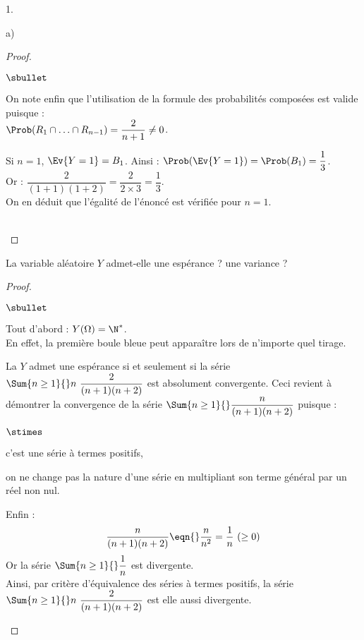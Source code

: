 \documentclass[11pt]{article}%
\begin{document}
\begin{noliste}{1.}
\begin{noliste}{a)}
\begin{proof}
\begin{noliste}{$\sbullet$}
      \item On note enfin que l'utilisation de la formule des
        probabilités composées est valide puisque : \\[.1cm]
        $\Prob(R_1 \cap
        \ldots \cap R_{n-1}) = \dfrac{2}{n+1} \neq 0$.
        
       \item Si $n = 1$, $\Ev{Y = 1} = B_1$. Ainsi : $\Prob(\Ev{Y = 1})
        = \Prob(B_1) = \dfrac{1}{3}$.\\
        Or : $\dfrac{2}{(1+1)(1+2)} = \dfrac{2}{2 \times 3} =
        \dfrac{1}{3}$.\\[.2cm]
        On en déduit que l'égalité de l'énoncé est vérifiée pour $n =
        1$.
      \end{noliste}
      ~\\[-1cm]
    \end{proof}


    \newpage


  \item La variable aléatoire $Y$ admet-elle une espérance ? une
    variance ?
    
    \begin{proof}~
      \begin{noliste}{$\sbullet$}
      \item Tout d'abord : $Y(\Omega) = \N^*$.\\
        En effet, la première boule bleue peut apparaître lors de
        n'importe quel tirage.
      \item La \var $Y$ admet une espérance si et seulement si la
        série $\Sum{n \geq 1}{} n \ \dfrac{2}{(n+1)(n+2)}$ est
        absolument convergente. Ceci revient à démontrer la
        convergence de la série $\Sum{n \geq 1}{}
        \dfrac{n}{(n+1)(n+2)}$ puisque :
        \begin{noliste}{$\stimes$}
        \item c'est une série à termes positifs,
        \item on ne change pas la nature d'une série en multipliant
          son terme général par un réel non nul.
        \end{noliste}

      \item Enfin :
        \[
        \dfrac{n}{(n+1)(n+2)} \eqn{} \dfrac{n}{n^2} = \dfrac{1}{n} \
        (\geq 0)
        \]
        Or la série $\Sum{n \geq 1}{} \dfrac{1}{n}$ est divergente.\\
        Ainsi, par critère d'équivalence des séries à termes positifs,
        la série $\Sum{n \geq 1}{} n \ \dfrac{2}{(n+1)(n+2)}$ est elle
        aussi divergente.  %
        

\end{noliste}
\end{proof}
\end{noliste}
\end{noliste}
\end{document}
